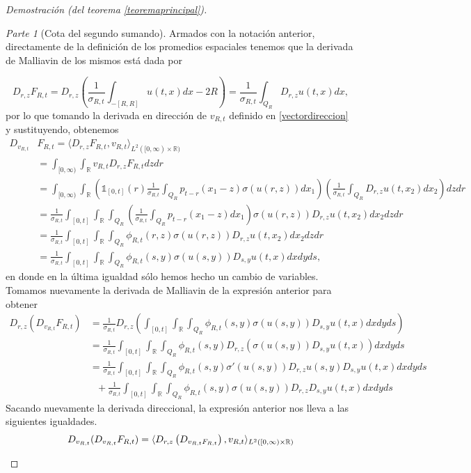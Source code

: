 \documentclass[letterpaper,twoside,12pt]{book}
\newcommand{\R}{\mathbb{R}}
\newcommand{\1}{\mathds{1}}
\theoremstyle{definition}
\theoremstyle{definition}
\theoremstyle{remark}
\newtheorem{proofpart}{Parte}
\theoremstyle{definition}
\theoremstyle{definition}
\theoremstyle{definition}
\theoremstyle{definition}
\theoremstyle{definition}
\begin{document}
\begin{proof}[Demostración (del teorema \ref{teoremaprincipal})]
\begin{proofpart}[Cota del segundo sumando]
Armados con la notación anterior, directamente de la definición de los promedios espaciales tenemos que la derivada de Malliavin de los mismos está dada por 

\[
   D_{r,z}F_{R,t}=D_{r,z}\left(\frac{1}{\sigma_{R,t}}\int_{-[R,R]}u(t,x)dx-2R\right)=\frac{1}{\sigma_{R,t}}\int_{Q_R}D_{r,z}u(t,x)dx,
\]
por lo que tomando la derivada en dirección de $v_{R,t}$ definido en \eqref{vectordireccion} y sustituyendo, obtenemos 
\begin{align*}
   D_{v_{R,t}}&F_{R,t}=\langle D_{r,z}F_{R,t},v_{R,t}\rangle_{L^{2}([0,\infty)\times\R)}\\
   &=\int_{[0,\infty)}\int_\R v_{R,t}D_{r,z}F_{R,t}dz dr\\
   &=\int_{[0,\infty)}\int_\R\left(\1_{[0,t]}(r)\frac{1}{\sigma_{R,t}}\int_{Q_R}p_{t-r}(x_1-z)\sigma(u(r,z))dx_1\right)\left(\frac{1}{\sigma_{R,t}}\int_{Q_R}D_{r,z}u(t,x_2)dx_2\right) dz dr\\
   &=\frac{1}{\sigma_{R,t}}\int_{[0,t]}\int_\R \int_{Q_R}\left(\frac{1}{\sigma_{R,t}}\int_{Q_R}p_{t-r}(x_1-z)dx_1\right)\sigma(u(r,z))D_{r,z}u(t,x_2) dx_2dz dr\\
   &=\frac{1}{\sigma_{R,t}}\int_{[0,t]}\int_\R \int_{Q_R}\phi_{R,t}(r,z)\sigma(u(r,z))D_{r,z}u(t,x_2) dx_2dz dr\\
   &=\frac{1}{\sigma_{R,t}}\int_{[0,t]}\int_\R \int_{Q_R}\phi_{R,t}(s,y)\sigma(u(s,y))D_{s,y}u(t,x) dx dy ds,
\end{align*}
   en donde en la última igualdad sólo hemos hecho un cambio de variables. Tomamos nuevamente la derivada de Malliavin de la expresión anterior para obtener 
\begin{align*}
   D_{r,z}(D_{v_{R,t}}F_{R,t})&=\frac{1}{\sigma_{R,t}}D_{r,z}\left(\int_{[0,t]}\int_\R \int_{Q_R}\phi_{R,t}(s,y)\sigma(u(s,y))D_{s,y}u(t,x) dx dy ds\right)\\
   &=\frac{1}{\sigma_{R,t}}\int_{[0,t]}\int_\R \int_{Q_R}\phi_{R,t}(s,y)D_{r,z}\left(\sigma(u(s,y))D_{s,y}u(t,x)\right) dx dy ds\\
   &=\frac{1}{\sigma_{R,t}}\int_{[0,t]}\int_\R \int_{Q_R}\phi_{R,t}(s,y)\sigma'(u(s,y))D_{r,z}u(s,y)D_{s,y}u(t,x)dx dy ds\\
   & \ \ \ +\frac{1}{\sigma_{R,t}}\int_{[0,t]}\int_\R \int_{Q_R}\phi_{R,t}(s,y)\sigma(u(s,y))D_{r,z}D_{s,y}u(t,x)dx dy ds
\end{align*}
Sacando nuevamente la derivada direccional, la expresión anterior nos lleva a las siguientes igualdades.
\begin{align}
   D_{v_{R,t}}&(D_{v_{R,t}}F_{R,t})=\langle D_{r,z}\left(D_{v_{R,t}F_{R,t}}\right),v_{R,t}\rangle_{L^{2}([0,\infty)\times\R)}\notag\\

\end{align}
\end{proofpart}
\end{proof}
\end{document}
